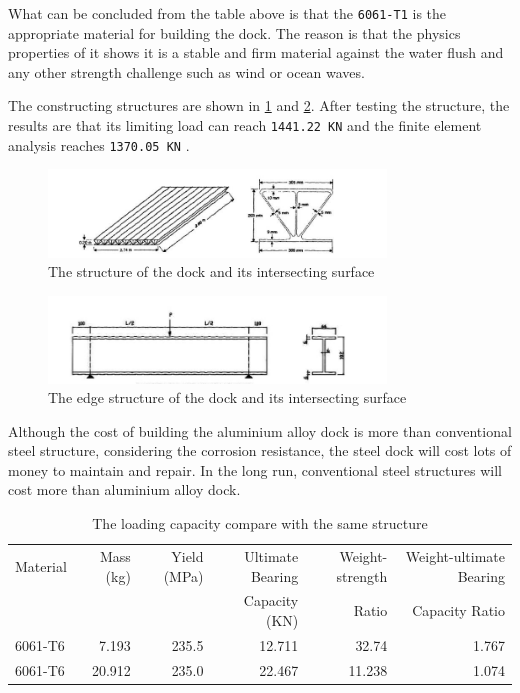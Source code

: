\documentclass[11pt]{article}
\numberwithin{equation}{section}
\begin{document}
What can be concluded from the table above is that the \texttt{6061-T1} is the appropriate material for building the dock. The reason is that the physics properties of it shows it is a stable and firm material against the water flush and any other strength challenge such as wind or ocean waves.

The constructing structures are shown in \ref{constructing_structure1} and \ref{constructing_structure2}. After testing the structure, the results are that its limiting load can reach \texttt{1441.22 KN} and the finite element analysis reaches \texttt{1370.05 KN} \cite{10.1061/(ASCE)0887-3828(2001)15:2(68)}.

\begin{figure}[H]
\centering
\includegraphics[width=0.8\textwidth]{Figures/constructing_structure1.jpg}
\caption{\label{constructing_structure1}The structure of the dock and its intersecting surface}
\end{figure}

\begin{figure}[H]
\centering
\includegraphics[width=0.8\textwidth]{Figures/constructing_structure2.jpg}
\caption{\label{constructing_structure2}The edge structure of the dock and its intersecting surface}
\end{figure}

Although the cost of building the aluminium alloy dock is more than conventional steel structure, considering the corrosion resistance, the steel dock will cost lots of money to maintain and repair. In the long run, conventional steel structures will cost more than aluminium alloy dock.

\begin{table}[H]
\caption{\label{The_loading_capacity_compare_with_the_same_structure}The loading capacity compare with the same structure \cite{10.2749/101686606778995164}}
\centering
\begin{tabular}{lrrrrr}
\toprule
Material & Mass (kg) & Yield (MPa) & Ultimate Bearing & Weight-strength & Weight-ultimate Bearing\\
 &  &  & Capacity (KN) & Ratio & Capacity Ratio\\
\midrule
6061-T6 & 7.193 & 235.5 & 12.711 & 32.74 & 1.767\\
6061-T6 & 20.912 & 235.0 & 22.467 & 11.238 & 1.074\\
\bottomrule
\end{tabular}
\end{table}
\end{document}
